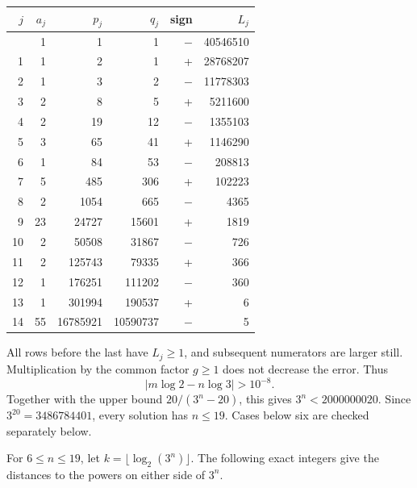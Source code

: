 \documentclass[
  11pt,
  a4paper,
]{article}
\newcounter{none} %
\begin{document}
{\def\LTcaptype{none} %
\begin{longtable}[]{@{}rrrrrr@{}}
\toprule\noalign{}
\(j\) & \(a_j\) & \(p_j\) & \(q_j\) & sign & \(L_j\) \\
\midrule\noalign{}
\endhead
\bottomrule\noalign{}
\endlastfoot
0 & 1 & 1 & 1 & \(-\) & 40546510 \\
1 & 1 & 2 & 1 & + & 28768207 \\
2 & 1 & 3 & 2 & \(-\) & 11778303 \\
3 & 2 & 8 & 5 & + & 5211600 \\
4 & 2 & 19 & 12 & \(-\) & 1355103 \\
5 & 3 & 65 & 41 & + & 1146290 \\
6 & 1 & 84 & 53 & \(-\) & 208813 \\
7 & 5 & 485 & 306 & + & 102223 \\
8 & 2 & 1054 & 665 & \(-\) & 4365 \\
9 & 23 & 24727 & 15601 & + & 1819 \\
10 & 2 & 50508 & 31867 & \(-\) & 726 \\
11 & 2 & 125743 & 79335 & + & 366 \\
12 & 1 & 176251 & 111202 & \(-\) & 360 \\
13 & 1 & 301994 & 190537 & + & 6 \\
14 & 55 & 16785921 & 10590737 & \(-\) & 5 \\
\end{longtable}
}

All rows before the last have \(L_j\ge1\), and subsequent numerators are
larger still. Multiplication by the common factor \(g\ge1\) does not
decrease the error. Thus \[
 |m\log2-n\log3|>10^{-8}.
 \tag{21.13}
\] Together with the upper bound \(20/(3^n-20)\), this gives
\(3^n<2000000020\). Since \(3^{20}=3486784401\), every solution has
\(n\le19\). Cases below six are checked separately below.

For \(6\le n\le19\), let \(k=\lfloor\log_2(3^n)\rfloor\). The following
exact integers give the distances to the powers on either side of
\(3^n\).
\end{document}
